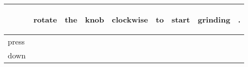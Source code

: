 \documentclass[landscape]{article}
\newcommand{\ssp}{\hspace{2pt}}
\begin{document}
\noindent\begin{tabular}{|l|p{10pt}|p{10pt}|p{10pt}|p{10pt}|p{10pt}|p{10pt}|p{10pt}|p{10pt}|}
\hline
&\begin{sideways}\cellcolor{ref0}rotate\hspace{12pt}\end{sideways}&\begin{sideways}\cellcolor{ref1}the\hspace{12pt}\end{sideways}&\begin{sideways}\cellcolor{ref2}knob\hspace{12pt}\end{sideways}&\begin{sideways}\cellcolor{ref3}clockwise\hspace{12pt}\end{sideways}&\begin{sideways}\cellcolor{ref4}to\hspace{12pt}\end{sideways}&\begin{sideways}\cellcolor{ref5}start\hspace{12pt}\end{sideways}&\begin{sideways}\cellcolor{ref6}grinding\hspace{12pt}\end{sideways}&\begin{sideways}\cellcolor{ref7}.\hspace{12pt}\end{sideways}\\
\hline
\ssp press \ssp&\hspace{2pt}&\hspace{2pt}&\hspace{2pt}&\hspace{2pt}&\hspace{2pt}&\hspace{2pt}&\hspace{2pt}&\hspace{2pt}\\
\hline
\ssp down \ssp&\hspace{2pt}&\hspace{2pt}&\hspace{2pt}&\hspace{2pt}&\hspace{2pt}&\hspace{2pt}&\hspace{2pt}&\hspace{2pt}\\

\end{tabular}
\end{document}

